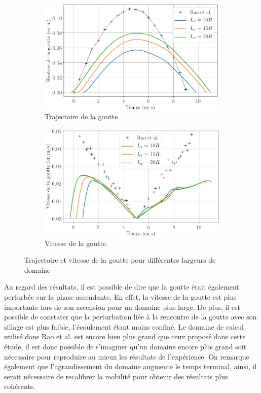 \begin{figure}[H] 
	\centering
	\begin{subfigure}[H]{0.47\textwidth}
		\centering
		\includegraphics[width=\textwidth]{figure/impactDom_nospeed_position.png}
		\caption{Trajectoire de la goutte}
	\end{subfigure} 
	\begin{subfigure}[H]{0.47\textwidth}
		\centering
		\includegraphics[width=\textwidth]{figure/impactDom_nospeed_vitesse.png}
		\caption{Vitesse de la goutte}
	\end{subfigure}
	\caption{Trajectoire et vitesse de la goutte pour différentes largeurs de domaine}
	\label{fig:impactdom}
\end{figure}

Au regard des résultats, il est possible de dire que la goutte était également perturbée sur la phase ascendante. En effet, la vitesse de la goutte est plus importante lors de son ascension pour un domaine plus large. De plus, il est possible de constater que la perturbation liée à la rencontre de la goutte avec son sillage est plus faible, l'écoulement étant moins confiné. Le domaine de calcul utilisé dans Rao et al. \cite{rao_influence_2015} est encore bien plus grand que ceux proposé dans cette étude, il est donc possible de s'imaginer qu'un domaine encore plus grand soit nécessaire pour reproduire au mieux les résultats de l'expérience. On remarque également que l'agrandissement du domaine augmente le temps terminal, ainsi, il serait nécessaire de recalibrer la mobilité pour obtenir des résultats plus cohérents.


